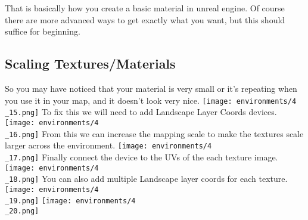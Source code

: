 \documentclass[../main.tex]{subfiles}
\begin{document}
That is basically how you create a basic material in unreal engine. Of course there are more advanced ways to get exactly what you want, but this should suffice for beginning.
\subsection{Scaling Textures/Materials}
So you may have noticed that your material is very small or it’s repeating when you use it in your map, and it doesn’t look very nice.
\texttt{[image: environments/4\\\_15.png]}
To fix this we will need to add Landscape Layer Coords devices.
\texttt{[image: environments/4\\\_16.png]}
From this we can increase the mapping scale to make the textures scale larger across the environment.
\texttt{[image: environments/4\\\_17.png]}
Finally connect the device to the UVs of the each texture image.
\texttt{[image: environments/4\\\_18.png]}
You can also add multiple Landscape layer coords for each texture.
\texttt{[image: environments/4\\\_19.png]}
\texttt{[image: environments/4\\\_20.png]}
\end{document}

